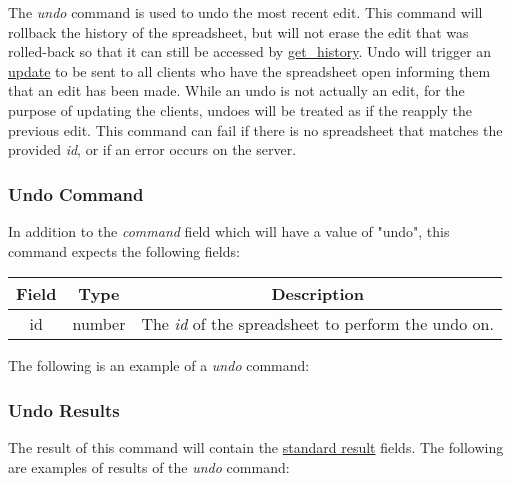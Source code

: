 The \emph{undo} command is used to undo the most recent edit. This command 
will rollback the history of the spreadsheet, but will not erase the edit 
that was rolled-back so that it can still be accessed by \hyperref[sec:message:get_history]{get\_history}. 
Undo will trigger an \hyperref[lst:update:edits]{update} to be sent to all 
clients who have the spreadsheet open informing them that an edit has been 
made. While an undo is not actually an edit, for the purpose of updating 
the clients, undoes will be treated as if the reapply the previous edit. 
This command can fail if there is no spreadsheet that matches the provided \emph{id}, 
or if an error occurs on the server.

\subsubsection{Undo Command}
In addition to the \emph{command} field which will have a value of "undo", this command expects the following fields:
\begin{table}[H]
    \begin{center}
        \begin{tabular}{|c|c|c|}\hline
            Field & Type & Description \\\hline
            id & number & The \emph{id} of the spreadsheet to perform the undo on. \\\hline
        \end{tabular}
    \end{center}
\end{table}

The following is an example of a \emph{undo} command:


\subsubsection{Undo Results}
The result of this command will contain the \hyperref[sec:message:result]{standard result} fields.
The following are examples of results of the \emph{undo} command:




